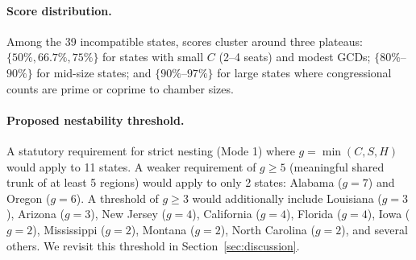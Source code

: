 \paragraph{Score distribution.}  Among the 39 incompatible states, scores
cluster around three plateaus: $\{50\%, 66.7\%, 75\%\}$ for states with
small $C$ (2--4 seats) and modest GCDs; $\{80\%$--$90\%\}$ for mid-size
states; and $\{90\%$--$97\%\}$ for large states where congressional counts
are prime or coprime to chamber sizes.

\paragraph{Proposed nestability threshold.}  A statutory requirement for strict
nesting (Mode 1) where $g = \min(C,S,H)$ would apply to 11 states.  A weaker
requirement of $g \geq 5$ (meaningful shared trunk of at least 5 regions)
would apply to only 2 states: Alabama ($g=7$) and Oregon ($g=6$).  A
threshold of $g \geq 3$ would additionally include Louisiana ($g=3$), Arizona
($g=3$), New Jersey ($g=4$), California ($g=4$), Florida ($g=4$), Iowa ($g=2$),
Mississippi ($g=2$), Montana ($g=2$), North Carolina ($g=2$), and several others.
We revisit this threshold in Section~\ref{sec:discussion}.
